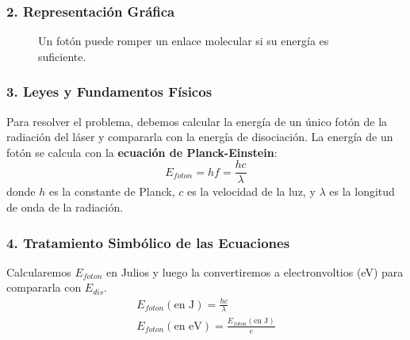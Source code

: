 \subsubsection*{2. Representación Gráfica}
\begin{figure}[H]
    \centering
    \caption{Un fotón puede romper un enlace molecular si su energía es suficiente.}
\end{figure}

\subsubsection*{3. Leyes y Fundamentos Físicos}
Para resolver el problema, debemos calcular la energía de un único fotón de la radiación del láser y compararla con la energía de disociación. La energía de un fotón se calcula con la \textbf{ecuación de Planck-Einstein}:
$$ E_{foton} = hf = \frac{hc}{\lambda} $$
donde $h$ es la constante de Planck, $c$ es la velocidad de la luz, y $\lambda$ es la longitud de onda de la radiación.

\subsubsection*{4. Tratamiento Simbólico de las Ecuaciones}
Calcularemos $E_{foton}$ en Julios y luego la convertiremos a electronvoltios (eV) para compararla con $E_{dis}$.
\begin{gather}
    E_{foton} (\text{en J}) = \frac{hc}{\lambda} \\
    E_{foton} (\text{en eV}) = \frac{E_{foton} (\text{en J})}{e}
\end{gather}

